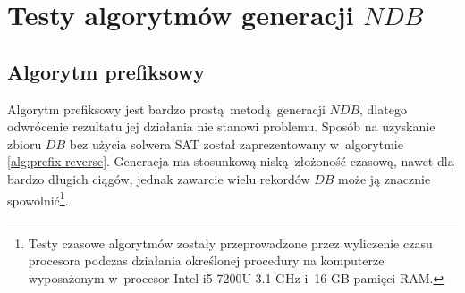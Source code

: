 \section{Testy algorytmów generacji $NDB$}
\subsection{Algorytm prefiksowy}
Algorytm prefiksowy jest bardzo prostą metodą generacji $NDB$, dlatego odwrócenie rezultatu jej działania nie stanowi problemu. Sposób na uzyskanie zbioru $DB$ bez użycia solwera SAT został zaprezentowany w~algorytmie \ref{alg:prefix-reverse}.
Generacja ma stosunkową niską złożoność czasową, nawet dla bardzo długich ciągów, jednak zawarcie wielu rekordów $DB$ może ją znacznie spowolnić\footnote{Testy czasowe algorytmów zostały przeprowadzone przez wyliczenie czasu procesora podczas działania określonej procedury na komputerze wyposażonym w~procesor Intel i5-7200U 3.1 GHz i~16 GB pamięci RAM.}.

